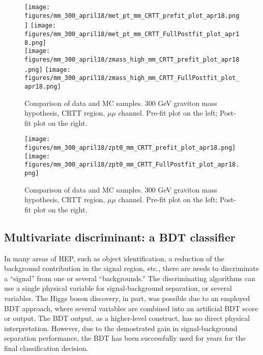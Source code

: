 \begin{figure}[H]
\begin{center}
\texttt{[image: figures/mm\_300\_april18/met\_pt\_mm\_CRTT\_prefit\_plot\_apr18.png]}
\texttt{[image: figures/mm\_300\_april18/met\_pt\_mm\_CRTT\_FullPostfit\_plot\_apr18.png]}\\
\texttt{[image: figures/mm\_300\_april18/zmass\_high\_mm\_CRTT\_prefit\_plot\_apr18.png]}
\texttt{[image: figures/mm\_300\_april18/zmass\_high\_mm\_CRTT\_FullPostfit\_plot\_apr18.png]}\\
\caption[Data-MC comparison in CRTT.]{Comparison of data and MC samples. 300 GeV graviton mass hypothesis, CRTT region, $\mu\mu$ channel. Pre-fit plot on the left; Post-fit plot on the right.}
\label{MCcomparisons_mm_low_CRTT_4}
\end{center}
\end{figure}


\begin{figure}[H]
\begin{center}
\texttt{[image: figures/mm\_300\_april18/zpt0\_mm\_CRTT\_prefit\_plot\_apr18.png]}
\texttt{[image: figures/mm\_300\_april18/zpt0\_mm\_CRTT\_FullPostfit\_plot\_apr18.png]}\\
\caption[Data-MC comparison in CRTT.]{Comparison of data and MC samples. 300 GeV graviton mass hypothesis, CRTT region, $\mu\mu$ channel. Pre-fit plot on the left; Post-fit plot on the right.}
\label{MCcomparisons_mm_low_CRTT_5}
\end{center}
\end{figure}

\subsection{Multivariate discriminant: a BDT classifier}

In many areas of HEP, such as object identification, a reduction of the background contribution in the signal region, etc., there are needs to discriminate a ``signal'' from one or several ``backgrounds.'' The discriminating algorithms can use a single physical variable for signal-background separation, or several variables. The Higgs boson discovery, in part, was possible due to an employed BDT approach, where several variables are combined into an artificial BDT score or output. The BDT output, as a higher-level construct, has no direct physical interpretation. However, due to the demostrated gain in signal-background separation performance, the BDT has been successfully used for years for the final classification decision. 

